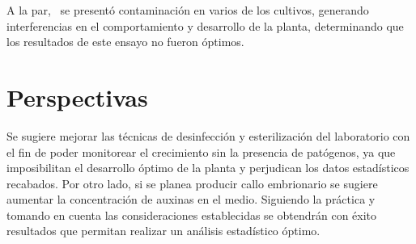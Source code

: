 \documentclass{article}
\begin{document}
\begin{multicols}{2}
A la par,  se presentó contaminación en varios de los cultivos, generando interferencias en el comportamiento y desarrollo de la planta, determinando que los resultados de este ensayo no fueron óptimos.


\section{Perspectivas}
Se sugiere mejorar las técnicas de desinfección y esterilización del laboratorio con el fin de poder monitorear el crecimiento sin la presencia de patógenos, ya que imposibilitan el desarrollo óptimo de la planta y perjudican los datos estadísticos recabados. Por otro lado, si se planea producir callo embrionario se sugiere aumentar la concentración de auxinas en el medio. Siguiendo la práctica y tomando en cuenta las consideraciones establecidas se obtendrán con éxito resultados que permitan realizar un análisis estadístico óptimo. 



 

\end{multicols}
\end{document}
